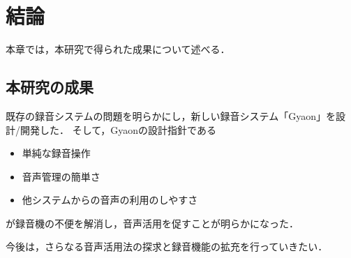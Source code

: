 \chapter{結論}
\label{chap:conclusion}

本章では，本研究で得られた成果について述べる．

\newpage

\section{本研究の成果}

既存の録音システムの問題を明らかにし，新しい録音システム「Gyaon」を設計/開発した．
そして，Gyaonの設計指針である

\begin{itemize}
\item 単純な録音操作
\item 音声管理の簡単さ
\item 他システムからの音声の利用のしやすさ
\end{itemize}

が録音機の不便を解消し，音声活用を促すことが明らかになった．

今後は，さらなる音声活用法の探求と録音機能の拡充を行っていきたい．
